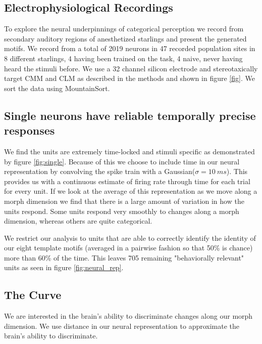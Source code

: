\subsection{Electrophysiological Recordings}

To explore the neural underpinnings of categorical perception we record from secondary auditory regions of anesthetized starlings and present the generated motifs. We record from a total of 2019 neurons in 47 recorded population sites in 8 different starlings, 4 having been trained on the task, 4 naive, never having heard the stimuli before. We use a 32 channel silicon electrode and stereotaxically target \ac{CMM} and \ac{CLM} as described in the methods and shown in figure \ref{fig}. We sort the data using MountainSort\cite{mountainsort}. 

\subsection{Single neurons have reliable temporally precise responses}



We find the units are extremely time-locked and stimuli specific as demonstrated by figure \ref{fig:single}. Because of this we choose to include time in our neural representation by convolving the spike train with a Gaussian($\sigma = \SI{10}{ms}$). This provides us with a continuous estimate of firing rate through time for each trial for every unit. If we look at the average of this representation as we move along a morph dimension we find that there is a large amount of variation in how the units respond. Some units respond very smoothly to changes along a morph dimension, whereas others are quite categorical.



We restrict our analysis to units that are able to correctly identify the identity of our eight template motifs (averaged in a pairwise fashion so that 50\% is chance) more than 60\% of the time. This leaves 705 remaining "behaviorally relevant" units as seen in figure \ref{fig:neural_rep}.

\subsection{The \Thielk Curve}



We are interested in the brain's ability to discriminate changes along our morph dimension. We use distance in our neural representation to approximate the brain's ability to discriminate. 

